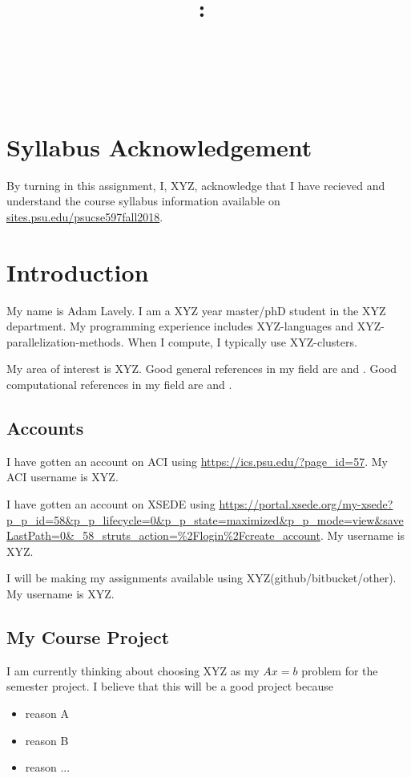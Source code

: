 \documentclass{article}
\title{\vspace{2in}\textmd{\textbf{\hmwkClass:\ \hmwkTitle}}\\\normalsize\vspace{0.1in}\small{\hmwkDueDate}\\\vspace{0.1in}\large{\textit{\hmwkClassInstructor\ \hmwkClassTime}}\vspace{3in}}
\date{}
\author{\textbf{\hmwkAuthorNameb} } %
\begin{document}
\begin{spacing}{1.1}
\maketitle

\newpage
\section{Syllabus Acknowledgement}

By turning in this assignment, I, XYZ, acknowledge that I have recieved and understand the course syllabus information available on \url{sites.psu.edu/psucse597fall2018}. 

\section{Introduction}

My name is Adam Lavely.  I am a XYZ year master/phD student in the XYZ department. My programming experience includes XYZ-languages and XYZ-parallelization-methods.  When I compute, I typically use XYZ-clusters. 

My area of interest is XYZ. Good general references in my field are \citet{wilcox2000basic} and \citet{kreyszig2010advanced}.  Good computational references in my field are \citet{anderson1995computational} and \citet{wilcox1998turbulence}.


\subsection{Accounts}

I have gotten an account on ACI using \url{https://ics.psu.edu/?page_id=57}.  My ACI username is XYZ.

I have gotten an account on XSEDE using \url{https://portal.xsede.org/my-xsede?p_p_id=58&p_p_lifecycle=0&p_p_state=maximized&p_p_mode=view&saveLastPath=0&_58_struts_action=%2Flogin%2Fcreate_account}.  My username is XYZ.

I will be making my assignments available using XYZ(github/bitbucket/other). My username is XYZ. 

\subsection{My Course Project}

I am currently thinking about choosing XYZ as my $Ax=b$ problem for the semester project. I believe that this will be a good project because
\begin{itemize}
  \item reason A
  \item reason B
  \item reason ...
\end{itemize}



\end{spacing}
\end{document}
